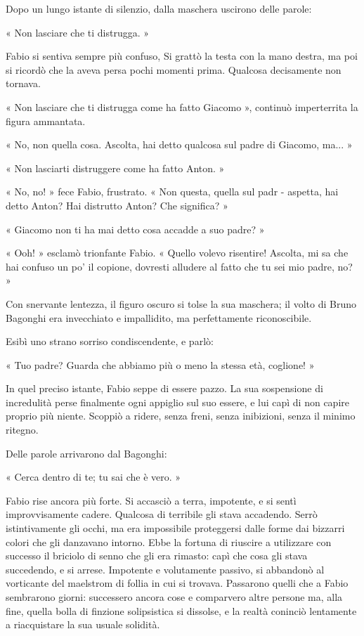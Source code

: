 Dopo un lungo istante di silenzio, dalla maschera uscirono delle parole:

« Non lasciare che ti distrugga. »

Fabio si sentiva sempre più confuso, Si grattò la testa con la mano destra, ma poi si ricordò che la aveva persa pochi momenti prima. Qualcosa decisamente non tornava.

« Non lasciare che ti distrugga come ha fatto Giacomo », continuò imperterrita la figura ammantata.

« No, non quella cosa. Ascolta, hai detto qualcosa sul padre di Giacomo, ma...  »

« Non lasciarti distruggere come ha fatto Anton. »

« No, no! » fece Fabio, frustrato. « Non questa, quella sul padr - aspetta, hai detto Anton? Hai distrutto Anton? Che significa? »

« Giacomo non ti ha mai detto cosa accadde a suo padre? »

« Ooh! » esclamò trionfante Fabio. « Quello volevo risentire! Ascolta, mi sa che hai confuso un po' il copione, dovresti alludere al fatto che tu sei mio padre, no? »

Con snervante lentezza, il figuro oscuro si tolse la sua maschera; il volto di Bruno Bagonghi era invecchiato e impallidito, ma perfettamente riconoscibile.

Esibì uno strano sorriso condiscendente, e parlò:

« Tuo padre? Guarda che abbiamo più o meno la stessa età, coglione! »

In quel preciso istante, Fabio seppe di essere pazzo. La sua sospensione di incredulità perse finalmente ogni appiglio sul suo essere, e lui capì di non capire proprio più niente. Scoppiò a ridere, senza freni, senza inibizioni, senza il minimo ritegno.

Delle parole arrivarono dal Bagonghi:

« Cerca dentro di te; tu sai che è vero. »

Fabio rise ancora più forte. Si accasciò a terra, impotente, e si sentì improvvisamente cadere. Qualcosa di terribile gli stava accadendo. Serrò istintivamente gli occhi, ma era impossibile proteggersi dalle forme dai bizzarri colori che gli danzavano intorno. Ebbe la fortuna di riuscire a utilizzare con successo il briciolo di senno che gli era rimasto: capì che cosa gli stava succedendo, e si arrese. 
Impotente e volutamente passivo, si abbandonò al vorticante del maelstrom di follia in cui si trovava. Passarono quelli che a Fabio sembrarono giorni: successero ancora cose e comparvero altre persone ma, alla fine, quella bolla di finzione solipsistica si dissolse, e la realtà coninciò lentamente a riacquistare la sua usuale solidità.